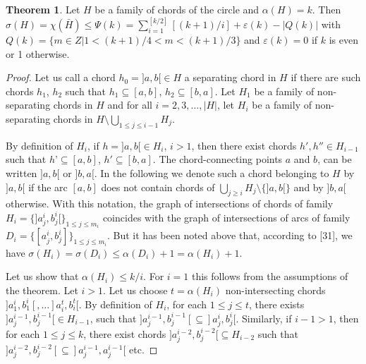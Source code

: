 \documentclass{article}
\theoremstyle{definition}
\newtheorem{thm}{Theorem}
\begin{document}
    \begin{thm}
        Let $H$ be a family 
        of chords of the 
        circle and $\alpha\left(H\right) = k $.
        Then $\sigma(H) = \chi(\bar{H}) \leq 
        \Psi(k) = \sum_{i = 1}^{[k/2]}[(k+1)/i] 
        + \varepsilon\left(k\right) - \left|Q(k)\right|$ 
        with $Q(k) = \{m \in Z | 1< (k+1)/4 < m < (k+1)/3\}$ 
        and $\varepsilon\left(k\right) = 0$ 
        if $k$ is even or 1 otherwise.
    \end{thm}
    \begin{proof}
        Let us call a chord 
        $h_0 = ]a, b[ \in H$ 
        a separating chord in $H$ 
        if there are such chords 
        $h_1$, $h_2$ such that 
        $h_1 \subseteq [a, b]$, 
        $h_2 \subseteq [b,a]$. 
        Let $H_1$ be a family 
        of non-separating chords 
        in $H$ and for all 
        $i = 2, 3, \ldots, |H|$, 
        let $H_i$ be a family of 
        non-separating chords in 
        $H \setminus \bigcup_{1 \leq j \leq i-1} H_{j}$.

        By definition of $H_i$, 
        if $h = ]a, b[ \in H_i$, $i > 1$, 
        then there exist chords 
        $h', h'' \in H_{i-1}$ 
        such that $h’ \subseteq [a, b]$, 
        $h' \subseteq [b, a]$. 
        The chord-connecting points 
        $a$ and $b$, can be written 
        $]a, b[$ or $]b, a[$. 
        In the following we denote 
        such a chord belonging to $H$ 
        by $]a, b[$ if the arc $[a, b]$ 
        does not contain chords of 
        $\bigcup_{j \geq i} H_j \setminus \{]a, b[\}$ 
        and by $]b, a[$ otherwise. 
        With this notation, 
        the graph of intersections 
        of chords of family 
        $H_i = \{]a^i_j, b^i_j[\}_{1 \leq j \leq m_i}$ 
        coincides with the graph 
        of intersections of arcs 
        of family $D_i = \{[a^i_j, b^i_j]\}_{1 \leq j \leq m_i}$. 
        But it has been noted above that, 
        according to [31],  we have $\sigma\left(H_{i}\right)= 
        \sigma(D_i) \leq \alpha(D_i)+1 = 
        \alpha(H_i) + 1$. 

        Let us show that $\alpha(H_i) \leq k/i$. 
        For $i = 1$ this follows from 
        the assumptions of the theorem. 
        Let $i > 1$. Let us choose $t = \alpha(H_i)$ 
        non-intersecting chords $]a^i_1, b^i_1[,
        \ldots ]a^t_i, b^t_i[$.
        By definition of $H_{i}$, for each
        $1 \leq j \leq t$, there exists
        $]a^{i-1}_{j}, b^{i-1}_{j}[ \in H_{i-1}$,
        such that $]a^{i-1}_{j}, b^{i-1}_{j}[
        \subseteq ]a^{i}_{j}, b^{i}_{j}[$.
        Similarly, if $i - 1> 1$, 
        then for each $1 \leq j \leq k$, 
        there exist chords $]a^{i-2}_{j}, b^{i-2}_{j}[
        \subseteq H_{i-2}$ such that
        $]a^{i-2}_{j}, b^{i-2}_{j}[ \subseteq 
        ]a^{i-1}_{j}, a^{i-1}_{j}[$ etc.
        

\end{proof}
\end{document}
